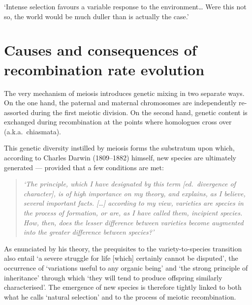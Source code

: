 \begin{savequote}[8cm]
‘Intense selection favours a variable response to the environment… Were this not so, the world would be much duller than is actually the case.’

\end{savequote}

\chapter{\label{ch:3-recombination-variation}Causes and consequences of recombination rate evolution} 

\minitoc{}


The very mechanism of meiosis introduces genetic mixing in two separate ways.
On the one hand, the paternal and maternal chromosomes are independently re-assorted during the first meiotic division.
On the second hand, genetic content is exchanged during recombination at the points where homologues cross over (a.k.a.\ chiasmata).

This genetic diversity instilled by meiosis forms the substratum upon which, according to Charles Darwin (1809--1882) himself, new species are ultimately generated — provided that a few conditions are met:

\begin{quote}
	\textit{‘The principle, which I have designated by this term [ed.\ divergence of character], is of high importance on my theory, and explains, as I believe, several important facts. […] according to my view, varieties are species in the process of formation, or are, as I have called them, incipient species. How, then, does the lesser difference between varieties become augmented into the greater difference between species?’}
\end{quote}

As enunciated by his theory, the prequisites to the variety-to-species transition also entail ‘a severe struggle for life [which] certainly cannot be disputed’, the occurrence of ‘variations useful to any organic being’ and ‘the strong principle of inheritance’ through which ‘they will tend to produce offspring similarly characterised’.
The emergence of new species is therefore tightly linked to both what he calls ‘natural selection’ and to the process of meiotic recombination.

